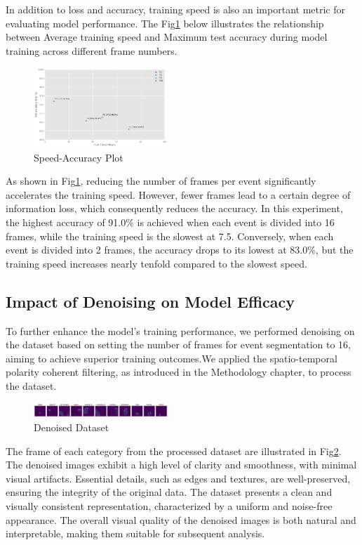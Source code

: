 \documentclass[conference]{IEEEtran}
\begin{document}
In addition to loss and accuracy, training speed is also an important metric for evaluating model performance. The Fig\ref{fig:speed-accuracy} below illustrates the relationship between Average training speed and Maximum test accuracy during model training across different frame numbers.
\begin{figure}
    \centering
    \includegraphics[width=0.45\textwidth]{figure/Accuracy_speed.png}
    \caption{Speed-Accuracy Plot}
    \label{fig:speed-accuracy}
\end{figure}

As shown in Fig\ref{fig:speed-accuracy}, reducing the number of frames per event significantly accelerates the training speed. However, fewer frames lead to a certain degree of information loss, which consequently reduces the accuracy. In this experiment, the highest accuracy of 91.0\% is achieved when each event is divided into 16 frames, while the training speed is the slowest at 7.5. Conversely, when each event is divided into 2 frames, the accuracy drops to its lowest at 83.0\%, but the training speed increases nearly tenfold compared to the slowest speed.

\subsection{Impact of Denoising on Model Efficacy}
To further enhance the model's training performance, we performed denoising on the dataset based on setting the number of frames for event segmentation to 16, aiming to achieve superior training outcomes.We applied the spatio-temporal polarity coherent filtering, as introduced in the Methodology chapter, to process the dataset. 
\begin{figure}[htbp]
    \centering
    \includegraphics[width=0.45\textwidth]{figure/denoise.png}
    \caption{Denoised Dataset}
    \label{fig:denoise}
\end{figure}

The frame of each category from the processed dataset are illustrated in Fig\ref{fig:denoise}. The denoised images exhibit a high level of clarity and smoothness, with minimal visual artifacts. Essential details, such as edges and textures, are well-preserved, ensuring the integrity of the original data. 
The dataset presents a clean and visually consistent representation, characterized by a uniform and noise-free appearance. The overall visual quality of the denoised images is both natural and interpretable, making them suitable for subsequent analysis.
\end{document}
